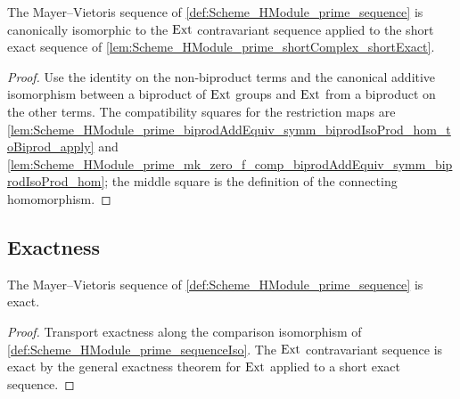 \begin{definition}\leanok
  \label{def:Scheme_HModule_prime_sequenceIso}

  The Mayer--Vietoris sequence of \cref{def:Scheme_HModule_prime_sequence} is canonically isomorphic to the \(\operatorname{Ext}\) contravariant sequence applied to the short exact sequence of \cref{lem:Scheme_HModule_prime_shortComplex_shortExact}.
\end{definition}

\begin{proof}
  
  \leanok
  Use the identity on the non-biproduct terms and the canonical additive isomorphism between a biproduct of \(\operatorname{Ext}\) groups and \(\operatorname{Ext}\) from a biproduct on the other terms. The compatibility squares for the restriction maps are \cref{lem:Scheme_HModule_prime_biprodAddEquiv_symm_biprodIsoProd_hom_toBiprod_apply} and \cref{lem:Scheme_HModule_prime_mk_zero_f_comp_biprodAddEquiv_symm_biprodIsoProd_hom}; the middle square is the definition of the connecting homomorphism.
\end{proof}

\subsection{Exactness}

\begin{theorem}\leanok
  \label{thm:Scheme_HModule_prime_sequence_exact}

  The Mayer--Vietoris sequence of \cref{def:Scheme_HModule_prime_sequence} is exact.
\end{theorem}

\begin{proof}
  
  \leanok
  Transport exactness along the comparison isomorphism of \cref{def:Scheme_HModule_prime_sequenceIso}. The \(\operatorname{Ext}\) contravariant sequence is exact by the general exactness theorem for \(\operatorname{Ext}\) applied to a short exact sequence.
\end{proof}

